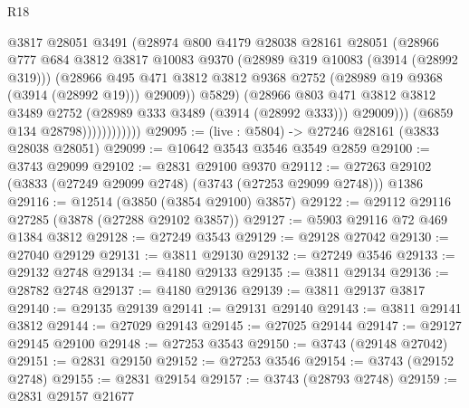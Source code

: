 \begin{lexlean}{R18}
\begin{coremodule}
                              @3817
                              @28051
                              @3491
                              (@28974
                                @800
                                @4179
                                @28038
                                @28161
                                @28051
                                (@28966
                                  @777
                                  @684
                                  @3812
                                  @3817
                                  @10083
                                  @9370
                                  (@28989 @319 @10083 (@3914 (@28992 @319)))
                                  (@28966
                                    @495
                                    @471
                                    @3812
                                    @3812
                                    @9368
                                    @2752
                                    (@28989 @19 @9368 (@3914 (@28992 @19)))
                                    @29009))
                                @5829)
                              (@28966
                                @803
                                @471
                                @3812
                                @3812
                                @3489
                                @2752
                                (@28989 @333 @3489 (@3914 (@28992 @333)))
                                @29009)))
                          (@6859 @134 @28798))))))))))))
@29095 := (live : @5804) -> @27246 @28161 (@3833 @28038 @28051)
@29099 := @10642 @3543 @3546 @3549 @2859
@29100 := @3743 @29099
@29102 := @2831 @29100 @9370
@29112 := @27263 @29102 (@3833 (@27249 @29099 @2748) (@3743 (@27253 @29099 @2748))) @1386
@29116 := @12514 (@3850 (@3854 @29100) @3857)
@29122 := @29112 @29116 @27285 (@3878 (@27288 @29102 @3857))
@29127 := @5903 @29116 @72 @469 @1384 @3812
@29128 := @27249 @3543
@29129 := @29128 @27042
@29130 := @27040 @29129
@29131 := @3811 @29130
@29132 := @27249 @3546
@29133 := @29132 @2748
@29134 := @4180 @29133
@29135 := @3811 @29134
@29136 := @28782 @2748
@29137 := @4180 @29136
@29139 := @3811 @29137 @3817
@29140 := @29135 @29139
@29141 := @29131 @29140
@29143 := @3811 @29141 @3812
@29144 := @27029 @29143
@29145 := @27025 @29144
@29147 := @29127 @29145 @29100
@29148 := @27253 @3543
@29150 := @3743 (@29148 @27042)
@29151 := @2831 @29150
@29152 := @27253 @3546
@29154 := @3743 (@29152 @2748)
@29155 := @2831 @29154
@29157 := @3743 (@28793 @2748)
@29159 := @2831 @29157 @21677

\end{coremodule}
\end{lexlean}

